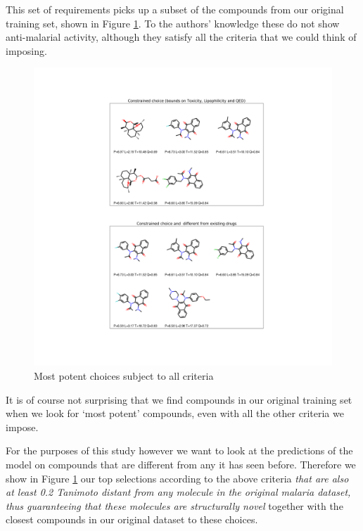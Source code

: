 \documentclass[journal=jacsat,manuscript=article]{achemso}
\begin{document}
This set of requirements picks up a subset of the compounds from our original training set, shown in Figure \ref{fig:best_in_data}. 
To the authors' knowledge these do not show anti-malarial activity, although they satisfy all the criteria that we could think of imposing.


\begin{figure}[h!]
\centering
\includegraphics[width=\textwidth]{fig7.png}
\caption{Most potent choices subject to all criteria}
\label{fig:best_in_data}
\end{figure}

It is of course not surprising that we find compounds in our original training set when we look for `most potent' compounds, even with all the other criteria we impose.  

\newline
\newline
For the purposes of this study however we want to look at the predictions of the model on compounds that are different from any it has seen before.  Therefore we show in Figure \ref{fig:best_in_data} our top selections according to the above criteria \textit{that are also at least 0.2 Tanimoto distant from any molecule in the original malaria dataset, thus guaranteeing that these molecules are structurally novel} together with the closest compounds in our original dataset to these choices.
\end{document}
